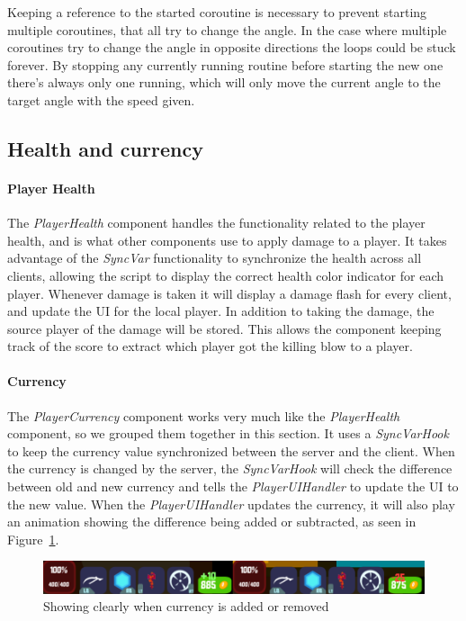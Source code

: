 Keeping a reference to the started coroutine is necessary to prevent starting multiple coroutines, that all try to change the angle. In the case where multiple coroutines try to change the angle in opposite directions the loops could be stuck forever. By stopping any currently running routine before starting the new one there's always only one running, which will only move the current angle to the target angle with the speed given.
    
\subsection{Health and currency}
\paragraph{Player Health}
The \emph{PlayerHealth} component handles the functionality related to the player health, and is what other components use to apply damage to a player. It takes advantage of the \emph{SyncVar} functionality to synchronize the health across all clients, allowing the script to display the correct health color indicator for each player. Whenever damage is taken it will display a damage flash for every client, and update the UI for the local player. In addition to taking the damage, the source player of the damage will be stored. This allows the component keeping track of the score to extract which player got the killing blow to a player.

\paragraph{Currency}
The \emph{PlayerCurrency} component works very much like the \emph{PlayerHealth} component, so we grouped them together in this section. It uses a \emph{SyncVarHook} to keep the currency value synchronized between the server and the client. When the currency is changed by the server, the \emph{SyncVarHook} will check the difference between old and new currency and tells the \emph{PlayerUIHandler} to update the UI to the new value. When the \emph{PlayerUIHandler} updates the currency, it will also play an animation showing the difference being added or subtracted, as seen in Figure~\ref{fig:addCurrency}.

\begin{figure}[tbph]
  \centering
  \includegraphics[width=\textwidth]{images/CurrencyChange}
  \caption[Example adding and subtracting currency]{Showing clearly when currency is added or removed}
  \label{fig:addCurrency}
\end{figure}


